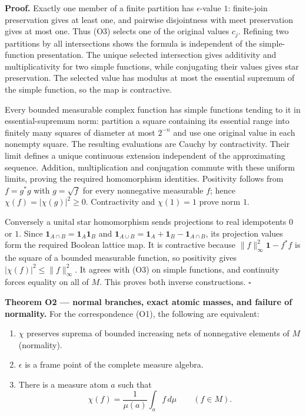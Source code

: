 \textbf{Proof.} Exactly one member of a finite partition has \(\epsilon\)-value \(1\): finite-join preservation gives at least one, and pairwise disjointness with meet preservation gives at most one. Thus (O3) selects one of the original values \(c_j\). Refining two partitions by all intersections shows the formula is independent of the simple-function presentation. The unique selected intersection gives additivity and multiplicativity for two simple functions, while conjugating their values gives star preservation. The selected value has modulus at most the essential supremum of the simple function, so the map is contractive.

Every bounded measurable complex function has simple functions tending to it in essential-supremum norm: partition a square containing its essential range into finitely many squares of diameter at most \(2^{-n}\) and use one original value in each nonempty square. The resulting evaluations are Cauchy by contractivity. Their limit defines a unique continuous extension independent of the approximating sequence. Addition, multiplication and conjugation commute with these uniform limits, proving the required homomorphism identities. Positivity follows from \(f=g^*g\) with \(g=\sqrt f\) for every nonnegative measurable \(f\); hence \(\chi(f)=|\chi(g)|^2\ge0\). Contractivity and \(\chi (1)=1\) prove norm \(1\).

Conversely a unital star homomorphism sends projections to real idempotents \(0\) or \(1\). Since \(\mathbf1_{A\cap B}=\mathbf1_A\mathbf1_B\) and \(\mathbf1_{A\cup B}=\mathbf1_A+\mathbf1_B-\mathbf1_{A\cap B}\), its projection values form the required Boolean lattice map. It is contractive because \(\|f\|_\infty^2\mathbf1-f^*f\) is the square of a bounded measurable function, so positivity gives \(|\chi(f)|^2\le\|f\|_\infty^2\). It agrees with (O3) on simple functions, and continuity forces equality on all of \(M\). This proves both inverse constructions. \(\square\)

\textbf{Theorem O2 --- normal branches, exact atomic masses, and failure of normality.} For the correspondence (O1), the following are equivalent:

\begin{enumerate}
\def\labelenumi{\arabic{enumi}.}
\tightlist
\item
  \(\chi\) preserves suprema of bounded increasing nets of nonnegative elements of \(M\) (normality).
\item
  \(\epsilon\) is a frame point of the complete measure algebra.
\item
  There is a measure atom \(a\) such that
  \[
  \chi(f)=\frac{1}{\mu(a)}\int_a f\,d\mu\qquad(f\in M).
  \tag{O4}
  \]
\end{enumerate}


